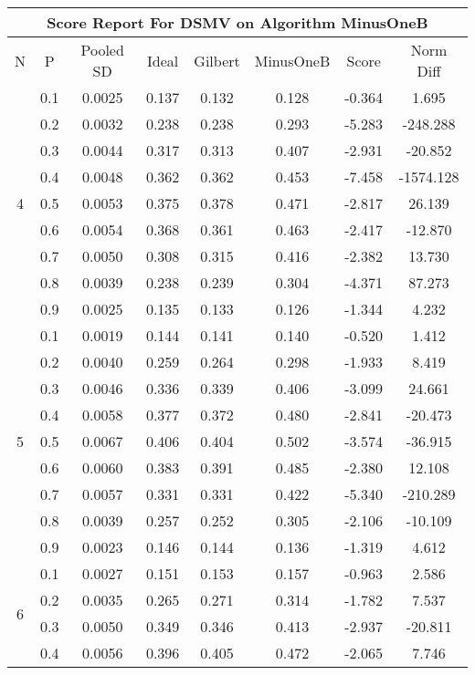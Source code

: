 \documentclass[11pt,a4paper]{report}
\begin{document}
\begin{longtable}{ | c | c || c | c | c | c | c | c | }
\hline
\multicolumn{8}{|c|}{ Score Report For DSMV on Algorithm MinusOneB} \\
\hline
N & P & Pooled SD &  Ideal &  Gilbert & MinusOneB  & Score & Norm Diff \\
 \hline
 \hline
 \endhead
\multirow{9}{*}{4} & 0.1 & 0.0025 & 0.137 & 0.132 & 0.128 & -0.364 & 1.695 \\
 & 0.2 & 0.0032 & 0.238 & 0.238 & 0.293 & -5.283 & -248.288 \\
 & 0.3 & 0.0044 & 0.317 & 0.313 & 0.407 & -2.931 & -20.852 \\
 & 0.4 & 0.0048 & 0.362 & 0.362 & 0.453 & -7.458 & -1574.128 \\
 & 0.5 & 0.0053 & 0.375 & 0.378 & 0.471 & -2.817 & 26.139 \\
 & 0.6 & 0.0054 & 0.368 & 0.361 & 0.463 & -2.417 & -12.870 \\
 & 0.7 & 0.0050 & 0.308 & 0.315 & 0.416 & -2.382 & 13.730 \\
 & 0.8 & 0.0039 & 0.238 & 0.239 & 0.304 & -4.371 & 87.273 \\
 & 0.9 & 0.0025 & 0.135 & 0.133 & 0.126 & -1.344 & 4.232 \\
 \hline
\multirow{9}{*}{5} & 0.1 & 0.0019 & 0.144 & 0.141 & 0.140 & -0.520 & 1.412 \\
 & 0.2 & 0.0040 & 0.259 & 0.264 & 0.298 & -1.933 & 8.419 \\
 & 0.3 & 0.0046 & 0.336 & 0.339 & 0.406 & -3.099 & 24.661 \\
 & 0.4 & 0.0058 & 0.377 & 0.372 & 0.480 & -2.841 & -20.473 \\
 & 0.5 & 0.0067 & 0.406 & 0.404 & 0.502 & -3.574 & -36.915 \\
 & 0.6 & 0.0060 & 0.383 & 0.391 & 0.485 & -2.380 & 12.108 \\
 & 0.7 & 0.0057 & 0.331 & 0.331 & 0.422 & -5.340 & -210.289 \\
 & 0.8 & 0.0039 & 0.257 & 0.252 & 0.305 & -2.106 & -10.109 \\
 & 0.9 & 0.0023 & 0.146 & 0.144 & 0.136 & -1.319 & 4.612 \\
 \hline
\multirow{9}{*}{6} & 0.1 & 0.0027 & 0.151 & 0.153 & 0.157 & -0.963 & 2.586 \\
 & 0.2 & 0.0035 & 0.265 & 0.271 & 0.314 & -1.782 & 7.537 \\
 & 0.3 & 0.0050 & 0.349 & 0.346 & 0.413 & -2.937 & -20.811 \\
 & 0.4 & 0.0056 & 0.396 & 0.405 & 0.472 & -2.065 & 7.746 \\

\end{longtable}
\end{document}
